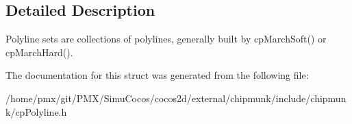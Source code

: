 \subsection{Detailed Description}
Polyline sets are collections of polylines, generally built by cp\+March\+Soft() or cp\+March\+Hard(). 

The documentation for this struct was generated from the following file\+:\begin{DoxyCompactItemize}
\item 
/home/pmx/git/\+P\+M\+X/\+Simu\+Cocos/cocos2d/external/chipmunk/include/chipmunk/cp\+Polyline.\+h\end{DoxyCompactItemize}
